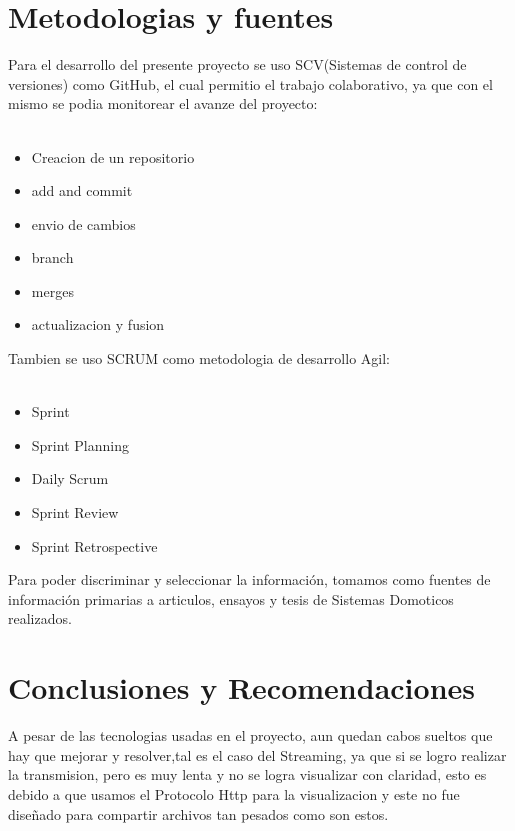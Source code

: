 \documentclass[letterpaper,12pt]{article}
\begin{document}
{\begin{itemize}
\begin{figure}[h]
			\end{figure}
			
			
		\end{itemize}
		
		\section{Metodologias y fuentes}
		
		Para el desarrollo del presente proyecto se uso SCV(Sistemas de control de versiones) como GitHub, el cual permitio el trabajo colaborativo, ya que con el mismo se podia monitorear el avanze del proyecto: \\\
		\begin{itemize}
			\item Creacion de un repositorio
			\item add and commit
			\item envio de cambios
			\item branch 
			\item merges
			\item actualizacion y fusion
			
		\end{itemize}
		
		Tambien se uso SCRUM como metodologia de desarrollo Agil: \\\
		\begin{itemize}
			\item Sprint
			
			\item Sprint Planning
			
			\item Daily Scrum
			
			\item Sprint Review
			
			\item Sprint Retrospective
			
		\end{itemize}
		
		
		Para poder discriminar y seleccionar la información, tomamos como fuentes de información primarias a articulos, ensayos y tesis de Sistemas Domoticos realizados.
		
		
		\section{Conclusiones y Recomendaciones}
		A pesar de las tecnologias usadas en el proyecto, aun quedan cabos sueltos que hay que mejorar y resolver,tal es el caso del Streaming, ya que si se logro realizar la transmision, pero es muy lenta y no se logra visualizar con claridad, esto es debido a que usamos el Protocolo Http para la visualizacion y este no fue diseñado para compartir archivos tan pesados como son estos.\\
		
}
\end{document}
